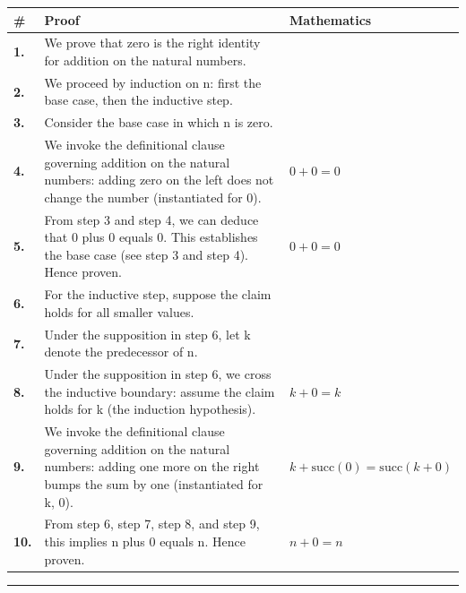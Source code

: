 \documentclass[11pt]{article}
\theoremstyle{definition}
\begin{document}
\begin{tabular}{@{} >{\raggedright\arraybackslash}p{} >{\raggedright\arraybackslash}p{} >{\raggedleft\arraybackslash}p{} @{}}
\textbf{\#} & \textbf{Proof} & \textbf{Mathematics} \\
\midrule
\textbf{1.} & We prove that zero is the right identity for addition on the natural numbers. & \\[0.45em]
\textbf{2.} & We proceed by induction on n: first the base case, then the inductive step. & \\[0.45em]
\textbf{3.} & Consider the base case in which n is zero. & \\[0.45em]
\textbf{4.} & We invoke the definitional clause governing addition on the natural numbers: adding zero on the left does not change the number (instantiated for 0). & $\displaystyle 0 + 0 = 0$ \\[0.45em]
\textbf{5.} & From step 3 and step 4, we can deduce that 0 plus 0 equals 0. This establishes the base case (see step 3 and step 4). Hence proven. & $\displaystyle 0 + 0 = 0$ \\[0.45em]
\textbf{6.} & For the inductive step, suppose the claim holds for all smaller values. & \\[0.45em]
\textbf{7.} & Under the supposition in step 6, let k denote the predecessor of n. & \\[0.45em]
\textbf{8.} & Under the supposition in step 6, we cross the inductive boundary: assume the claim holds for k (the induction hypothesis). & $\displaystyle k + 0 = k$ \\[0.45em]
\textbf{9.} & We invoke the definitional clause governing addition on the natural numbers: adding one more on the right bumps the sum by one (instantiated for k, 0). & $\displaystyle k + \mathrm{succ}(0) = \mathrm{succ}(k + 0)$ \\[0.45em]
\textbf{10.} & From step 6, step 7, step 8, and step 9, this implies n plus 0 equals n. Hence proven. & $\displaystyle n + 0 = n$ \\[0.45em]
\bottomrule
\end{tabular}
\label{thm:Nat-addition-zero_is_the_right_identity}
\par\medskip\hrule
\end{document}
